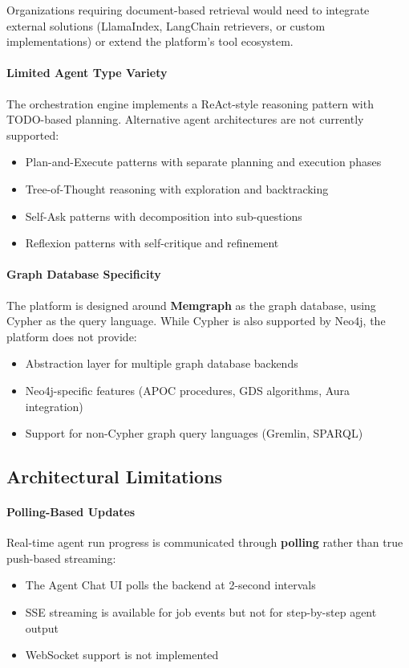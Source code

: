 Organizations requiring document-based retrieval would need to integrate external solutions (LlamaIndex, LangChain retrievers, or custom implementations) or extend the platform's tool ecosystem.

\paragraph{Limited Agent Type Variety}
The orchestration engine implements a ReAct-style reasoning pattern with TODO-based planning. Alternative agent architectures are not currently supported:
\begin{itemize}
    \item Plan-and-Execute patterns with separate planning and execution phases
    \item Tree-of-Thought reasoning with exploration and backtracking
    \item Self-Ask patterns with decomposition into sub-questions
    \item Reflexion patterns with self-critique and refinement
\end{itemize}

\paragraph{Graph Database Specificity}
The platform is designed around \textbf{Memgraph} as the graph database, using Cypher as the query language. While Cypher is also supported by Neo4j, the platform does not provide:
\begin{itemize}
    \item Abstraction layer for multiple graph database backends
    \item Neo4j-specific features (APOC procedures, GDS algorithms, Aura integration)
    \item Support for non-Cypher graph query languages (Gremlin, SPARQL)
\end{itemize}

\subsection{Architectural Limitations}

\paragraph{Polling-Based Updates}
Real-time agent run progress is communicated through \textbf{polling} rather than true push-based streaming:
\begin{itemize}
    \item The Agent Chat UI polls the backend at 2-second intervals
    \item SSE streaming is available for job events but not for step-by-step agent output
    \item WebSocket support is not implemented
\end{itemize}

